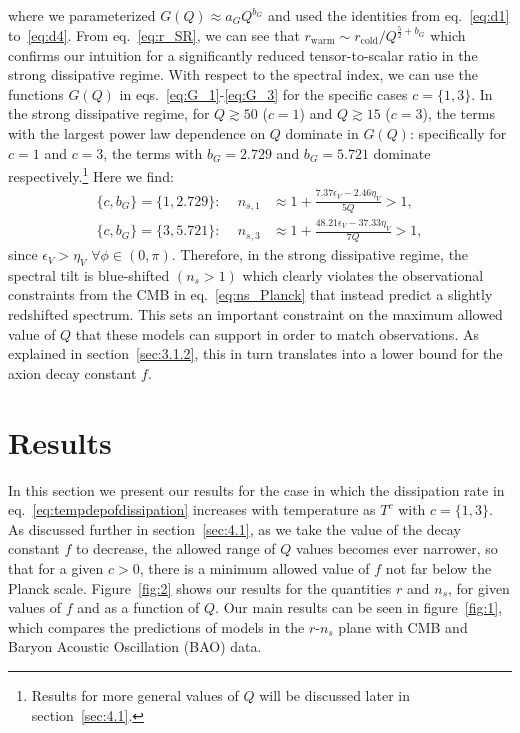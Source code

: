 \documentclass[a4paper,11pt]{article}
\begin{document}
where we parameterized $G(Q)\approx a_G Q^{b_G}$ and used the identities from eq.~\eqref{eq:d1} to~\eqref{eq:d4}. From eq.~\eqref{eq:r_SR}, we can see that $r_{\mathrm{warm}}\sim r_{\mathrm{cold}}/ Q^{\frac{5}{2}+b_G}$ which confirms our intuition for a significantly reduced tensor-to-scalar ratio in the strong dissipative regime. With respect to the spectral index, we can use the functions $G(Q)$ in eqs.~\eqref{eq:G_1}-\eqref{eq:G_3} for the specific cases $c=\{1,3\}$. In the strong dissipative regime, for $Q\gtrsim50$ ($c=1$) and $Q\gtrsim 15$ ($c=3$), the terms with the largest power law dependence on $Q$ dominate in $G(Q)$:  specifically for $c=1$ and $c=3$, the terms with $b_G = 2.729$ and $b_G=5.721$ dominate respectively.\footnote{Results for more general values of $Q$ will be discussed later in section~\ref{sec:4.1}.} Here we find:
\begin{align}
    \text{$\{c,b_G\}=\{1,2.729\}$: } \quad n_{s,1}&\approx 1+ \frac{7.37\epsilon_V-2.46\eta_V}{5Q}> 1, \label{eq:ns.SR1}\\
    \text{$\{c,b_G\}=\{3,5.721\}$: } \quad n_{s,3}&\approx 1+ \frac{48.21\epsilon_V-37.33\eta_V}{7Q}> 1, \label{eq:ns.SR3}
\end{align}
since $\epsilon_V>\eta_V$ $\forall \phi\in(0,\pi)$. Therefore, in the strong dissipative regime, the spectral tilt is blue-shifted $(n_s>1)$ which clearly violates the observational constraints from the CMB in eq.~\eqref{eq:ns_Planck} that instead predict a slightly redshifted spectrum. This sets an important constraint on the maximum allowed value of $Q$ that these models can support in order to match observations. As explained in section~\ref{sec:3.1.2}, this in turn translates into a lower bound for the axion decay constant $f$. 

\section{Results \label{sec:results}}

In this section we present our results for the case in which the dissipation rate in eq.~\eqref{eq:tempdepofdissipation} increases with temperature as $T^c$ with $c=\{1,3\}$.  As discussed further in section~\ref{sec:4.1}, as we take the value of the decay constant $f$ to decrease, the allowed range of $Q$ values becomes ever narrower, so that for a given $c>0$, there is a minimum allowed value of $f$ not far below the Planck scale. Figure~\ref{fig:2} shows our results for the quantities $r$ and $n_s$, for given values of $f$ and as a function of $Q$. Our main results can be seen in figure~\ref{fig:1}, which compares the predictions of models in the $r$-$n_s$ plane with CMB and Baryon Acoustic Oscillation (BAO) data. 
\end{document}
